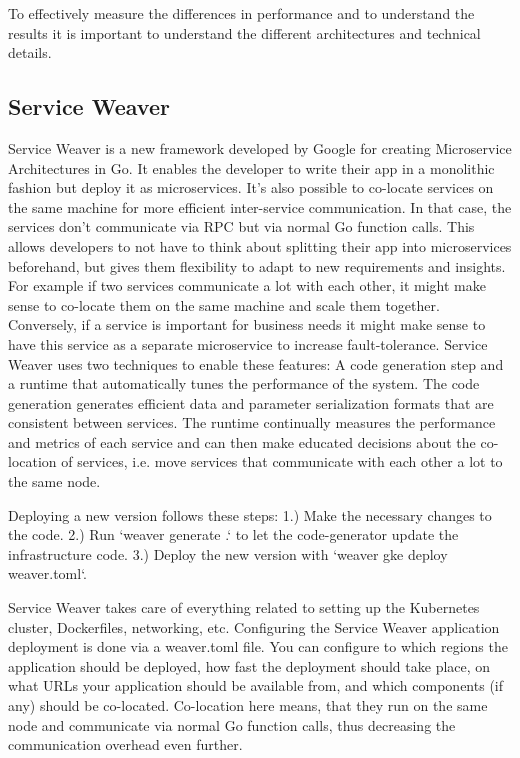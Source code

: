 \documentclass[sigconf,review,9pt]{acmart}
\begin{document}
To effectively measure the differences in performance and to understand the results
it is important to understand the different architectures and technical details.

\subsection{Service Weaver}
Service Weaver is a new framework developed by Google for creating Microservice
Architectures in Go. \cite{serviceWeaverSite}
It enables the developer to write their app in a monolithic fashion but deploy it as microservices.
It's also possible to co-locate services on the same machine for more efficient
inter-service communication.
In that case, the services don't communicate via RPC but via normal Go function calls.
This allows developers to not have to think about splitting their app into microservices
beforehand, but gives them flexibility to adapt to new requirements and insights.
For example if two services communicate a lot with each other, it might make sense
to co-locate them on the same machine and scale them together.
Conversely, if a service is important for business needs it might make sense to
have this service as a separate microservice to increase fault-tolerance.
Service Weaver uses two techniques to enable these features:
A code generation step and a runtime that automatically tunes the performance
of the system.
The code generation generates efficient data and parameter serialization formats
that are consistent between services.
The runtime continually measures the performance and metrics of each service and
can then make educated decisions about the co-location of services, i.e.
move services that communicate with each other a lot to the same node.

Deploying a new version follows these steps:
1.) Make the necessary changes to the code.
2.) Run `weaver generate .` to let the code-generator update the infrastructure code.
3.) Deploy the new version with `weaver gke deploy weaver.toml`.

Service Weaver takes care of everything related to setting up the Kubernetes cluster,
Dockerfiles, networking, etc.
Configuring the Service Weaver application deployment is done via a weaver.toml file.
You can configure to which regions the application should be deployed, how fast the
deployment should take place, on what URLs your application should be available from,
and which components (if any) should be co-located.
Co-location here means, that they run on the same node and communicate via normal
Go function calls, thus decreasing the communication overhead even further.
\end{document}
